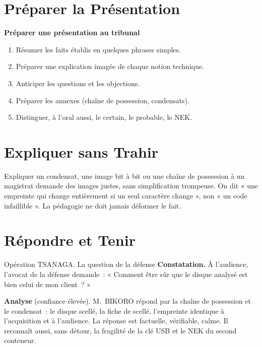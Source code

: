 \separateur

\section{Préparer la Présentation}
\label{sec:c19-preparer}

\begin{boxprocedure}
\textbf{Préparer une présentation au tribunal}
\begin{enumerate}
    \item Résumer les faits établis en quelques phrases simples.
    \item Préparer une explication imagée de chaque notion technique.
    \item Anticiper les questions et les objections.
    \item Préparer les annexes (chaîne de possession, condensats).
    \item Distinguer, à l'oral aussi, le certain, le probable, le NEK.
\end{enumerate}
\end{boxprocedure}

\section{Expliquer sans Trahir}
\label{sec:c19-expliquer}

Expliquer un condensat, une image bit à bit ou une chaîne de possession à un
magistrat demande des images justes, sans simplification trompeuse. On dit
« une empreinte qui change entièrement si un seul caractère change », non « un
code infaillible ». La pédagogie ne doit jamais déformer le fait.

\section{Répondre et Tenir}
\label{sec:c19-repondre}

\begin{boxscenario}{Opération TSANAGA. La question de la défense}
\textbf{Constatation.} À l'audience, l'avocat de la défense demande~:
« Comment être sûr que le disque analysé est bien celui de mon client~? »

\medskip
\textbf{Analyse} (confiance élevée). M.~BIKORO répond par la chaîne de
possession et le condensat~: le disque scellé, la fiche de scellé, l'empreinte
identique à l'acquisition et à l'audience. La réponse est factuelle, vérifiable,
calme. Il reconnaît aussi, sans détour, la fragilité de la clé USB et le NEK
du second conteneur.
\end{boxscenario}

